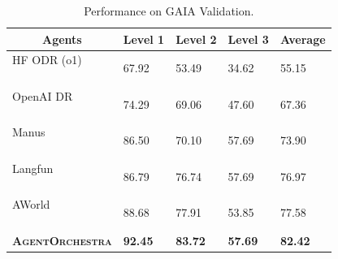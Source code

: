 \documentclass[11pt]{article}
\newcommand{\projectname}{\textbf{\textsc{AgentOrchestra}}\xspace}
\begin{document}
\begin{table}[t]
  \vspace{-0.2cm}
  \centering
  \caption{Performance on GAIA Validation.}
  \vspace{-0.2cm}
  \label{tab:gaia_validation}
  \renewcommand{\arraystretch}{0.8}
  \setlength{\tabcolsep}{1pt}
  \footnotesize
  \begin{tabular}{lp{0.4cm}p{0.4cm}p{0.4cm}p{0.4cm}}
    \toprule
    \multicolumn{1}{c}{\textbf{Agents}}
    & \multicolumn{1}{c}{\textbf{Level 1}}
    & \multicolumn{1}{c}{\textbf{Level 2}}
    & \multicolumn{1}{c}{\textbf{Level 3}}
    & \multicolumn{1}{c}{\textbf{Average}} \\
    \midrule
    \makecell{HF ODR (o1)\\~\citep{huggingface_open_deep_research_2024}} & 67.92 & 53.49 & 34.62 & 55.15 \\
    \makecell{OpenAI DR\\~\citep{openai2024deepresearch}}      & 74.29 & 69.06 & 47.60 & 67.36 \\
    \makecell{Manus\\~\citep{shen2025mindmachinerisemanus}}                     & 86.50 & 70.10 & 57.69 & 73.90 \\
    \makecell{Langfun\\~\citep{langfun_agent_2024}}             & 86.79 & 76.74 & 57.69 & 76.97 \\
    \makecell{AWorld\\~\citep{yu2025aworldorchestratingtrainingrecipe}}                    & 88.68 & 77.91 & 53.85 & 77.58 \\
    \projectname    & \textbf{92.45} & \textbf{83.72} & \textbf{57.69} & \textbf{82.42} \\
    \bottomrule
  \end{tabular}
\vspace{-0.5cm}
\end{table}
\end{document}
